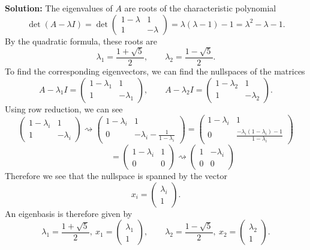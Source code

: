 \documentclass[11pt]{article}
\begin{document}
\begin{enumerate}
\begin{enumerate}
\textbf{Solution:} The eigenvalues of $A$ are roots of the characteristic polynomial
\[\det(A - \lambda I) = \det \begin{pmatrix} 1 - \lambda & 1 \\ 1 & -\lambda \end{pmatrix} = \lambda(\lambda-1) - 1 = \lambda^2 - \lambda - 1. \]
By the quadratic formula, these roots are
\[\lambda_1 = \frac{1 + \sqrt{5}}{2}, \qquad \lambda_2 = \frac{1 - \sqrt{5}}{2}.\]
To find the corresponding eigenvectors, we can find the nullspaces of the matrices
\[A - \lambda_1 I =  \begin{pmatrix} 1 - \lambda_1 & 1 \\ 1 & -\lambda_1 \end{pmatrix}, \qquad A - \lambda_2 I =  \begin{pmatrix} 1 - \lambda_2 & 1 \\ 1 & -\lambda_2 \end{pmatrix}.\]
Using row reduction, we can see
\[ \begin{pmatrix} 1 - \lambda_i & 1 \\ 1 & -\lambda_i \end{pmatrix} \rightsquigarrow \begin{pmatrix} 1 - \lambda_i & 1 \\ 0 & -\lambda_i - \frac{1}{1-\lambda_i} \end{pmatrix} = \begin{pmatrix} 1 - \lambda_i & 1 \\ 0 & \frac{-\lambda_i(1-\lambda_i) - 1}{1-\lambda_i} \end{pmatrix} \]
\[\qquad \qquad = \begin{pmatrix} 1 - \lambda_i & 1 \\ 0 & 0\end{pmatrix} 
\rightsquigarrow \begin{pmatrix} 1 & -\lambda_i \\ 0 & 0\end{pmatrix} \]
Therefore we see that the nullspace is spanned by the vector
\[x_i = \begin{pmatrix}\lambda_i \\ 1 \end{pmatrix}.\]
An eigenbasis is therefore given by
\[\lambda_1 = \frac{1 + \sqrt{5}}{2}, \ x_1 =  \begin{pmatrix}\lambda_1 \\1 \end{pmatrix}, \qquad \lambda_2 = \frac{1 - \sqrt{5}}{2}, \ x_2 =  \begin{pmatrix}\lambda_2 \\1 \end{pmatrix}.\]


\end{enumerate}
\end{enumerate}
\end{document}
